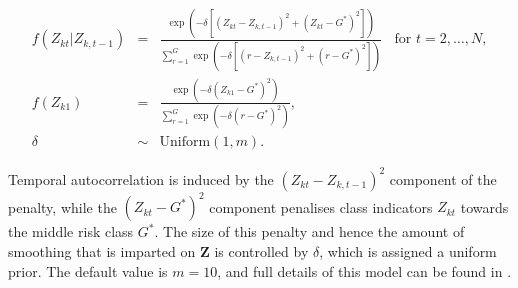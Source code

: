 \documentclass[article, nojss]{jss}
\begin{document}
\begin{eqnarray}
f(Z_{kt}|Z_{k,t-1})&=&\frac{\exp(-\delta[(Z_{kt}-Z_{k,t-1})^{2} +(Z_{kt}-G^{*})^{2}])}{\sum_{r=1}^{G}\exp(-\delta[(r-Z_{k,t-1})^{2}+(r-G^{*})^{2}])}~~~~\mbox{for } t=2,\ldots,N,\label{carcluster3}\\
f(Z_{k1})&=&\frac{\exp(-\delta(Z_{k1}-G^{*})^{2})}{\sum_{r=1}^{G}\exp(-\delta(r-G^{*})^{2})},\nonumber\\
\delta&\sim&\mbox{Uniform}(1,m).\nonumber
\end{eqnarray}

Temporal autocorrelation is induced by the $(Z_{kt}-Z_{k,t-1})^{2}$ component of the penalty, while the $(Z_{kt}-G^{*})^{2}$ component penalises class indicators $Z_{kt}$ towards the middle risk class $G^{*}$. The size of this penalty and hence the amount of smoothing that is imparted on $\mathbf{Z}$ is controlled by $\delta$, which is assigned a uniform prior. The default value is $m=10$, and full details of this model can be found in \cite{lee2016}.
\end{document}
